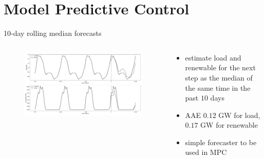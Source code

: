 \documentclass[aspectratio=169,11pt]{beamer}
\begin{document}
\section{Model Predictive Control}
\begin{frame}{10-day rolling median forecasts} 
    \begin{columns}
        \begin{column}{0.6\textwidth}
            \begin{figure}
                \centering
                \includegraphics[width=\columnwidth]{./figures/simple_forecasts.pdf}
            \end{figure}
        \end{column}
        \begin{column}{0.4\textwidth}
            \begin{itemize}
                \item estimate load and renewable for the next step
                as the median of the same time in the past $10$ days
                \item AAE $0.12$ GW for load, $0.17$ GW for renewable
                \item simple forecaster to be used in MPC
            \end{itemize}
        \end{column}
    \end{columns}
\end{frame}
\end{document}
